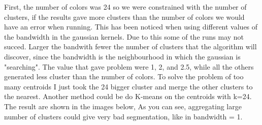 \documentclass{ETHExercise}
\begin{document}
First, the number of colors was 24 so we were constrained with the number of clusters, 
if the results gave more clusters than the number of colors we would have an error when running.
This has been noticed when using different values of the bandwidth in the gaussian kernels.
Due to this some of the runs may not succed. Larger the bandwith fewer the number of clusters that the 
algorithm will discover, since the bandwidth is the neighbourhood in which the gaussian is "searching". The value that gave problem were 1, 2, and 2.5, 
while all the others generated less cluster than the number of colors.
To solve the problem of too many centroids I just took the 24 bigger cluster and merge the other clusters to the nearest.
Another method could be do K-means on the centroids with k=24.
The result are shown in the images below, As you can see, aggregating large number of clusters could give very bad segmentation, like in bandwidth = 1.
\end{document}
